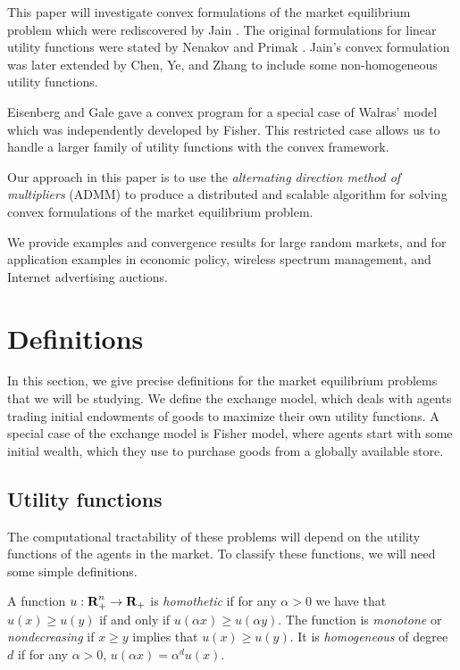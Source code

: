 \documentclass[12pt]{article}
\begin{document}
This paper will investigate convex formulations of the market
equilibrium problem which were rediscovered by Jain \cite{jain2007polynomial}.
The original formulations for linear utility functions
were stated by Nenakov and Primak \cite{nenakov1983algorithm}.
Jain's convex formulation was later extended by Chen, Ye, and Zhang \cite{chen2007note, chen2010equilibrium} to include some non-homogeneous
utility functions.

Eisenberg and Gale \cite{eisenberg1959consensus, gale1960theory, eisenberg1961aggregation} gave a convex program for a special case of Walras' model which was independently developed by Fisher. %
This restricted case allows us to handle a larger family of utility functions
with the convex framework.

Our approach in this paper is to use the \emph{alternating direction method of multipliers} (ADMM) \cite{boyd2011distributed} to produce a distributed and scalable algorithm for solving convex formulations of the market equilibrium problem.

We provide examples and convergence results for large random markets, and 
for application examples in economic policy, wireless spectrum management,
and Internet advertising auctions.

\section{Definitions}
In this section, we give precise definitions for the market equilibrium problems that we will be studying. We define the exchange model,
which deals with agents trading initial endowments of goods to maximize their own utility functions.
A special case of the exchange model is Fisher model, where agents
start with some initial wealth, which they use to purchase goods 
from a globally available store.

\subsection{Utility functions}
The computational tractability of these problems will depend on the
utility functions of the agents in the market.
To classify these functions, we will need some simple definitions.

A function $u: {\mbox{\bf R}}^n_+ \to {\mbox{\bf R}}_+$ is \emph{homothetic} if for any $\alpha > 0$ we have that $u(x) \geq u(y)$ if and only if
$u(\alpha x) \geq u(\alpha y)$.
The function is \emph{monotone} or \emph{nondecreasing} if $x \geq y$ implies that $u(x) \geq u(y)$.
It is \emph{homogeneous} of degree $d$ if for any $\alpha > 0$,
$u(\alpha x) = \alpha^d u(x)$.
\end{document}
